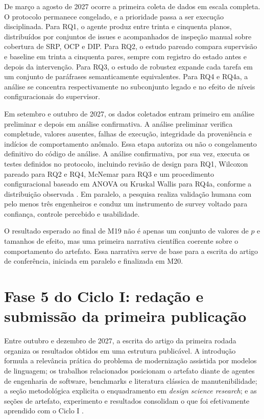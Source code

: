 \documentclass[12pt,a4paper]{article}
\begin{document}
De março a agosto de 2027 ocorre a primeira coleta de dados em escala completa. O protocolo permanece congelado, e a prioridade passa a ser execução disciplinada. Para RQ1, o agente produz entre trinta e cinquenta planos, distribuídos por conjuntos de issues e acompanhados de inspeção manual sobre cobertura de SRP, OCP e DIP. Para RQ2, o estudo pareado compara supervisão e baseline em trinta a cinquenta pares, sempre com registro do estado antes e depois da intervenção. Para RQ3, o estudo de robustez expande cada tarefa em um conjunto de paráfrases semanticamente equivalentes. Para RQ4 e RQ4a, a análise se concentra respectivamente no subconjunto legado e no efeito de níveis configuracionais do supervisor.

Em setembro e outubro de 2027, os dados coletados entram primeiro em análise preliminar e depois em análise confirmativa. A análise preliminar verifica completude, valores ausentes, falhas de execução, integridade da proveniência e indícios de comportamento anômalo. Essa etapa autoriza ou não o congelamento definitivo do código de análise. A análise confirmativa, por sua vez, executa os testes definidos no protocolo, incluindo revisão de design para RQ1, Wilcoxon pareado para RQ2 e RQ4, McNemar para RQ3 e um procedimento configuracional baseado em ANOVA ou Kruskal Wallis para RQ4a, conforme a distribuição observada \cite{wohlin2012}. Em paralelo, a pesquisa realiza validação humana com pelo menos três engenheiros e conduz um instrumento de survey voltado para confiança, controle percebido e usabilidade.

O resultado esperado ao final de M19 não é apenas um conjunto de valores de $p$ e tamanhos de efeito, mas uma primeira narrativa científica coerente sobre o comportamento do artefato. Essa narrativa serve de base para a escrita do artigo de conferência, iniciada em paralelo e finalizada em M20.

\section{Fase 5 do Ciclo I: redação e submissão da primeira publicação}

Entre outubro e dezembro de 2027, a escrita do artigo da primeira rodada organiza os resultados obtidos em uma estrutura publicável. A introdução formula a relevância prática do problema de modernização assistida por modelos de linguagem; os trabalhos relacionados posicionam o artefato diante de agentes de engenharia de software, benchmarks e literatura clássica de manutenibilidade; a seção metodológica explicita o enquadramento em \textit{design science research}; e as seções de artefato, experimento e resultados consolidam o que foi efetivamente aprendido com o Ciclo I \cite{hevner2004, yang2024, iso25010}.
\end{document}
